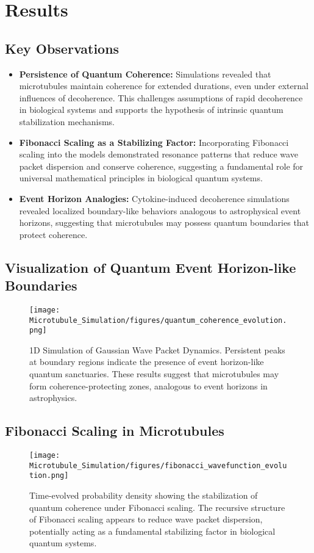 \section{Results}
\subsection{Key Observations}
\begin{itemize}
    \item \textbf{Persistence of Quantum Coherence:} Simulations revealed that microtubules maintain coherence for extended durations, even under external influences of decoherence. This challenges assumptions of rapid decoherence in biological systems and supports the hypothesis of intrinsic quantum stabilization mechanisms.
    \item \textbf{Fibonacci Scaling as a Stabilizing Factor:} Incorporating Fibonacci scaling into the models demonstrated resonance patterns that reduce wave packet dispersion and conserve coherence, suggesting a fundamental role for universal mathematical principles in biological quantum systems.
    \item \textbf{Event Horizon Analogies:} Cytokine-induced decoherence simulations revealed localized boundary-like behaviors analogous to astrophysical event horizons, suggesting that microtubules may possess quantum boundaries that protect coherence.
\end{itemize}
\subsection{Visualization of Quantum Event Horizon-like Boundaries}
\begin{figure}[H]
    \centering
    \texttt{[image: Microtubule\_Simulation/figures/quantum\_coherence\_evolution.png]}
    \caption{1D Simulation of Gaussian Wave Packet Dynamics. Persistent peaks at boundary regions indicate the presence of event horizon-like quantum sanctuaries. These results suggest that microtubules may form coherence-protecting zones, analogous to event horizons in astrophysics.}
    \label{fig:event_horizon}
\end{figure}
\subsection{Fibonacci Scaling in Microtubules}
\begin{figure}[H]
    \centering
    \texttt{[image: Microtubule\_Simulation/figures/fibonacci\_wavefunction\_evolution.png]}
    \caption{Time-evolved probability density showing the stabilization of quantum coherence under Fibonacci scaling. The recursive structure of Fibonacci scaling appears to reduce wave packet dispersion, potentially acting as a fundamental stabilizing factor in biological quantum systems.}
    \label{fig:fibonacci_scaling}
\end{figure}
